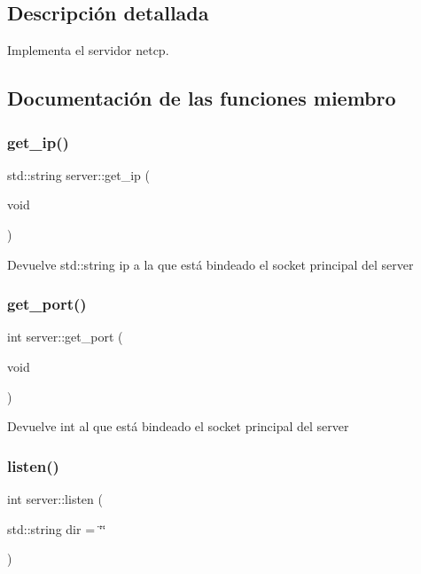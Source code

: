 \subsection{Descripción detallada}
Implementa el servidor netcp. 

\subsection{Documentación de las funciones miembro}
\mbox{\label{classserver_aa3ffb6541d4295c59a04ca6d72a8bed4}} 
\subsubsection{\texorpdfstring{get\+\_\+ip()}{get\_ip()}}
{\footnotesize\ttfamily std\+::string server\+::get\+\_\+ip (\begin{DoxyParamCaption}\item[{void}]{ }\end{DoxyParamCaption})}

\begin{DoxyReturn}{Devuelve}
std\+::string ip a la que está bindeado el socket principal del server 
\end{DoxyReturn}
\mbox{\label{classserver_a85c34ce8e949d74f068025b11bd04bcc}} 
\subsubsection{\texorpdfstring{get\+\_\+port()}{get\_port()}}
{\footnotesize\ttfamily int server\+::get\+\_\+port (\begin{DoxyParamCaption}\item[{void}]{ }\end{DoxyParamCaption})}

\begin{DoxyReturn}{Devuelve}
int al que está bindeado el socket principal del server 
\end{DoxyReturn}
\mbox{\label{classserver_a6e675f47d2b9eeeba5d8d8775f4ecb22}} 
\subsubsection{\texorpdfstring{listen()}{listen()}}
{\footnotesize\ttfamily int server\+::listen (\begin{DoxyParamCaption}\item[{std\+::string}]{dir = {\ttfamily \char`\"{}\char`\"{}} }\end{DoxyParamCaption})}



